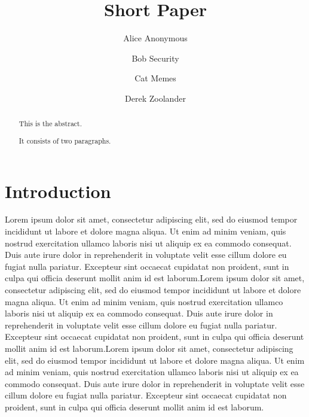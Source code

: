 \documentclass[]{elsarticle} %
\begin{document}
\begin{frontmatter}

  \title{Short Paper}
    \author[Some Institute of Technology]{Alice Anonymous}
    \author[Another University]{Bob Security}
    \author[Another University]{Cat Memes}
    \author[Some Institute of Technology]{Derek Zoolander}
      \address[Some Institute of Technology]{Department, Street, City, State, Zip}
    \address[Another University]{Department, Street, City, State, Zip}
  
  \begin{abstract}
  This is the abstract.
  
  It consists of two paragraphs.
  \end{abstract}
  
 \end{frontmatter}

\hypertarget{introduction}{%
\section{Introduction}\label{introduction}}

Lorem ipsum dolor sit amet, consectetur adipiscing elit, sed do eiusmod
tempor incididunt ut labore et dolore magna aliqua. Ut enim ad minim
veniam, quis nostrud exercitation ullamco laboris nisi ut aliquip ex ea
commodo consequat. Duis aute irure dolor in reprehenderit in voluptate
velit esse cillum dolore eu fugiat nulla pariatur. Excepteur sint
occaecat cupidatat non proident, sunt in culpa qui officia deserunt
mollit anim id est laborum.Lorem ipsum dolor sit amet, consectetur
adipiscing elit, sed do eiusmod tempor incididunt ut labore et dolore
magna aliqua. Ut enim ad minim veniam, quis nostrud exercitation ullamco
laboris nisi ut aliquip ex ea commodo consequat. Duis aute irure dolor
in reprehenderit in voluptate velit esse cillum dolore eu fugiat nulla
pariatur. Excepteur sint occaecat cupidatat non proident, sunt in culpa
qui officia deserunt mollit anim id est laborum.Lorem ipsum dolor sit
amet, consectetur adipiscing elit, sed do eiusmod tempor incididunt ut
labore et dolore magna aliqua. Ut enim ad minim veniam, quis nostrud
exercitation ullamco laboris nisi ut aliquip ex ea commodo consequat.
Duis aute irure dolor in reprehenderit in voluptate velit esse cillum
dolore eu fugiat nulla pariatur. Excepteur sint occaecat cupidatat non
proident, sunt in culpa qui officia deserunt mollit anim id est laborum.
\end{document}
